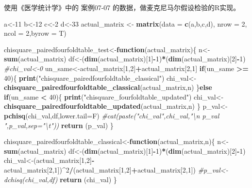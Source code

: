 \documentclass[
]{article}
\newenvironment{Shaded}{\begin{snugshade}}{\end{snugshade}}
\newcommand{\CommentTok}[1]{\textcolor[rgb]{0.56,0.35,0.01}{\textit{#1}}}
\newcommand{\ControlFlowTok}[1]{\textcolor[rgb]{0.13,0.29,0.53}{\textbf{#1}}}
\newcommand{\DataTypeTok}[1]{\textcolor[rgb]{0.13,0.29,0.53}{#1}}
\newcommand{\DecValTok}[1]{\textcolor[rgb]{0.00,0.00,0.81}{#1}}
\newcommand{\KeywordTok}[1]{\textcolor[rgb]{0.13,0.29,0.53}{\textbf{#1}}}
\newcommand{\NormalTok}[1]{#1}
\newcommand{\OperatorTok}[1]{\textcolor[rgb]{0.81,0.36,0.00}{\textbf{#1}}}
\newcommand{\StringTok}[1]{\textcolor[rgb]{0.31,0.60,0.02}{#1}}
\begin{document}
使用《医学统计学》中的 案例07-07 的数据，做麦克尼马尔假设检验的R实现。

\begin{Shaded}
\begin{Highlighting}[]
\NormalTok{a<-}\DecValTok{11}
\NormalTok{b<-}\DecValTok{12}
\NormalTok{c<-}\DecValTok{2}
\NormalTok{d<-}\DecValTok{33}
\NormalTok{actual_matrix <-}\StringTok{ }\KeywordTok{matrix}\NormalTok{(}\DataTypeTok{data =} \KeywordTok{c}\NormalTok{(a,b,c,d), }\DataTypeTok{nrow =} \DecValTok{2}\NormalTok{, }\DataTypeTok{ncol =} \DecValTok{2}\NormalTok{,}\DataTypeTok{byrow =}\NormalTok{ T)}

\NormalTok{chisquare_pairedfourfoldtable_test<-}\ControlFlowTok{function}\NormalTok{(actual_matrix)\{}
\NormalTok{     n<-}\KeywordTok{sum}\NormalTok{(actual_matrix)}
\NormalTok{     df<-(}\KeywordTok{dim}\NormalTok{(actual_matrix)[}\DecValTok{1}\NormalTok{]}\OperatorTok{-}\DecValTok{1}\NormalTok{)}\OperatorTok{*}\NormalTok{(}\KeywordTok{dim}\NormalTok{(actual_matrix)[}\DecValTok{2}\NormalTok{]}\OperatorTok{-}\DecValTok{1}\NormalTok{)}
     \CommentTok{#chi_val<-0}
\NormalTok{     un_same<-actual_matrix[}\DecValTok{1}\NormalTok{,}\DecValTok{2}\NormalTok{]}\OperatorTok{+}\NormalTok{actual_matrix[}\DecValTok{2}\NormalTok{,}\DecValTok{1}\NormalTok{]}
     \ControlFlowTok{if}\NormalTok{(un_same }\OperatorTok{>=}\StringTok{ }\DecValTok{40}\NormalTok{)\{}
          \KeywordTok{print}\NormalTok{(}\StringTok{"chisquare_pairedfourfoldtable_classical"}\NormalTok{)}
\NormalTok{          chi_val<-}\KeywordTok{chisquare_pairedfourfoldtable_classical}\NormalTok{(actual_matrix,n)}
\NormalTok{     \}}\ControlFlowTok{else} \ControlFlowTok{if}\NormalTok{(un_same }\OperatorTok{<}\StringTok{ }\DecValTok{40}\NormalTok{)\{}
          \KeywordTok{print}\NormalTok{(}\StringTok{"chisquare_fourfoldtable_updated"}\NormalTok{)}
\NormalTok{          chi_val<-}\KeywordTok{chisquare_pairedfourfoldtable_updated}\NormalTok{(actual_matrix,n)}
\NormalTok{     \}}
\NormalTok{     p_val<-}\KeywordTok{pchisq}\NormalTok{(chi_val,df,}\DataTypeTok{lower.tail=}\NormalTok{F)}
     \CommentTok{#cat(paste("chi_val",chi_val,"\textbackslash{}n p_val ",p_val,sep="\textbackslash{}t"))}
     \KeywordTok{return}\NormalTok{ (p_val)}
\NormalTok{\}}

\NormalTok{chisquare_pairedfourfoldtable_classical<-}\ControlFlowTok{function}\NormalTok{(actual_matrix,n)\{}
\NormalTok{     n<-}\KeywordTok{sum}\NormalTok{(actual_matrix)}
\NormalTok{     df<-(}\KeywordTok{dim}\NormalTok{(actual_matrix)[}\DecValTok{1}\NormalTok{]}\OperatorTok{-}\DecValTok{1}\NormalTok{)}\OperatorTok{*}\NormalTok{(}\KeywordTok{dim}\NormalTok{(actual_matrix)[}\DecValTok{2}\NormalTok{]}\OperatorTok{-}\DecValTok{1}\NormalTok{)}
\NormalTok{     chi_val<-(actual_matrix[}\DecValTok{1}\NormalTok{,}\DecValTok{2}\NormalTok{]}\OperatorTok{-}\NormalTok{actual_matrix[}\DecValTok{2}\NormalTok{,}\DecValTok{1}\NormalTok{])}\OperatorTok{^}\DecValTok{2}\OperatorTok{/}\NormalTok{(actual_matrix[}\DecValTok{1}\NormalTok{,}\DecValTok{2}\NormalTok{]}\OperatorTok{+}\NormalTok{actual_matrix[}\DecValTok{2}\NormalTok{,}\DecValTok{1}\NormalTok{])}
     \CommentTok{#p_val<-dchisq(chi_val,df)}
     \KeywordTok{return}\NormalTok{ (chi_val)}
\NormalTok{\}}


\end{Highlighting}
\end{Shaded}
\end{document}
